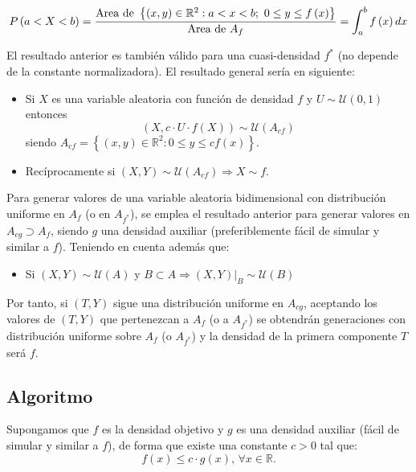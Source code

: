 \documentclass[
]{book}
\providecommand{\tightlist}{%
  \setlength{\itemsep}{0pt}\setlength{\parskip}{0pt}}
\theoremstyle{break}
\theoremstyle{definition}
\theoremstyle{definition}
\theoremstyle{definition}
\theoremstyle{remark}
\begin{document}
\[ P\left( a<X<b\right) = \frac{\text{Area de }\left\{ \left( x,y\right) \in 
\mathbb{R}^{2}:a<x<b;~0\leq y\leq f\left( x\right) \right\} }{\text{Area de }
A_{f}} \\
= \int_{a}^{b}f\left( x\right) dx \]

El resultado anterior es también válido para una cuasi-densidad \(f^{\ast}\)
(no depende de la constante normalizadora).
El resultado general sería en siguiente:

\begin{itemize}
\item
  Si \(X\) es una variable aleatoria con función de densidad \(f\)
  y \(U \sim \mathcal{U}\left( 0, 1 \right)\) entonces
  \[\left( X,c\cdot U\cdot f\left( X\right) \right) \sim \mathcal{U}\left(
  A_{cf}\right)\]
  siendo
  \(A_{cf}=\left\{ \left( x, y \right) \in \mathbb{R}^{2} : 0 \leq y \leq cf\left( x \right) \right\}\).
\item
  Recíprocamente si \(\left( X,Y\right) \sim \mathcal{U}\left(A_{cf}\right) \Rightarrow X\sim f\).
\end{itemize}

Para generar valores de una variable aleatoria bidimensional con distribución uniforme
en \(A_{f}\) (o en \(A_{f^{\ast }}\)), se emplea el resultado anterior para
generar valores en \(A_{cg} \supset A_{f}\), siendo \(g\) una densidad auxiliar
(preferiblemente fácil de simular y similar a \(f\)).
Teniendo en cuenta además que:

\begin{itemize}
\tightlist
\item
  Si \(\left( X,Y\right) \sim \mathcal{U}\left( A\right)\) y
  \(B \subset A\Rightarrow \left. \left( X,Y\right) \right\vert _{B} \sim \mathcal{U}\left(B\right)\)
\end{itemize}

Por tanto, si \(\left( T, Y \right)\) sigue una distribución
uniforme en \(A_{cg}\), aceptando los valores de
\(\left( T, Y\right)\) que pertenezcan a \(A_{f}\) (o a \(A_{f^{\ast }}\)) se obtendrán
generaciones con distribución uniforme sobre \(A_{f}\) (o \(A_{f^{\ast }}\))
y la densidad de la primera componente \(T\) será \(f\).

\hypertarget{algoritmo}{%
\subsection{Algoritmo}\label{algoritmo}}

Supongamos que \(f\) es la densidad objetivo y \(g\) es una densidad
auxiliar (fácil de simular y similar a \(f\)), de forma que
existe una constante \(c>0\) tal que:
\[f\left( x\right) \leq c\cdot g\left( x\right) 
\text{, }\forall x\in \mathbb{R}\text{.}\]
\end{document}
